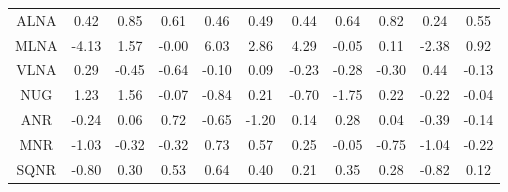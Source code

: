 \begin{longtable}{ | c || c | c | c | c | c | c | c | c | c || c |}
ALNA &  \cellcolor[HTML]{F7F7FF} 0.42 &  \cellcolor[HTML]{E7E7FF} 0.85 &  \cellcolor[HTML]{EFEFFF} 0.61 &  \cellcolor[HTML]{F7F7FF} 0.46 &  \cellcolor[HTML]{EFEFFF} 0.49 &  \cellcolor[HTML]{F7F7FF} 0.44 &  \cellcolor[HTML]{EFEFFF} 0.64 &  \cellcolor[HTML]{E7E7FF} 0.82 &  \cellcolor[HTML]{F7F7FF} 0.24 &  \cellcolor[HTML]{EFEFFF} 0.55 \\
MLNA &  \cellcolor[HTML]{FF9797} -4.13 &  \cellcolor[HTML]{D7D7FF} 1.57 &  \cellcolor[HTML]{FFFFFF} -0.00 &  \cellcolor[HTML]{6868FF} 6.03 &  \cellcolor[HTML]{B7B7FF} 2.86 &  \cellcolor[HTML]{9797FF} 4.29 &  \cellcolor[HTML]{FFFFFF} -0.05 &  \cellcolor[HTML]{FFFFFF} 0.11 &  \cellcolor[HTML]{FFC7C7} -2.38 &  \cellcolor[HTML]{E7E7FF} 0.92 \\
VLNA &  \cellcolor[HTML]{F7F7FF} 0.29 &  \cellcolor[HTML]{FFF7F7} -0.45 &  \cellcolor[HTML]{FFEFEF} -0.64 &  \cellcolor[HTML]{FFFFFF} -0.10 &  \cellcolor[HTML]{FFFFFF} 0.09 &  \cellcolor[HTML]{FFF7F7} -0.23 &  \cellcolor[HTML]{FFF7F7} -0.28 &  \cellcolor[HTML]{FFF7F7} -0.30 &  \cellcolor[HTML]{F7F7FF} 0.44 &  \cellcolor[HTML]{FFFFFF} -0.13 \\
NUG &  \cellcolor[HTML]{DFDFFF} 1.23 &  \cellcolor[HTML]{D7D7FF} 1.56 &  \cellcolor[HTML]{FFFFFF} -0.07 &  \cellcolor[HTML]{FFE7E7} -0.84 &  \cellcolor[HTML]{F7F7FF} 0.21 &  \cellcolor[HTML]{FFEFEF} -0.70 &  \cellcolor[HTML]{FFCFCF} -1.75 &  \cellcolor[HTML]{F7F7FF} 0.22 &  \cellcolor[HTML]{FFF7F7} -0.22 &  \cellcolor[HTML]{FFFFFF} -0.04 \\
ANR &  \cellcolor[HTML]{FFF7F7} -0.24 &  \cellcolor[HTML]{FFFFFF} 0.06 &  \cellcolor[HTML]{EFEFFF} 0.72 &  \cellcolor[HTML]{FFEFEF} -0.65 &  \cellcolor[HTML]{FFDFDF} -1.20 &  \cellcolor[HTML]{FFFFFF} 0.14 &  \cellcolor[HTML]{F7F7FF} 0.28 &  \cellcolor[HTML]{FFFFFF} 0.04 &  \cellcolor[HTML]{FFF7F7} -0.39 &  \cellcolor[HTML]{FFFFFF} -0.14 \\
MNR &  \cellcolor[HTML]{FFE7E7} -1.03 &  \cellcolor[HTML]{FFF7F7} -0.32 &  \cellcolor[HTML]{FFF7F7} -0.32 &  \cellcolor[HTML]{EFEFFF} 0.73 &  \cellcolor[HTML]{EFEFFF} 0.57 &  \cellcolor[HTML]{F7F7FF} 0.25 &  \cellcolor[HTML]{FFFFFF} -0.05 &  \cellcolor[HTML]{FFEFEF} -0.75 &  \cellcolor[HTML]{FFE7E7} -1.04 &  \cellcolor[HTML]{FFF7F7} -0.22 \\
SQNR &  \cellcolor[HTML]{FFE7E7} -0.80 &  \cellcolor[HTML]{F7F7FF} 0.30 &  \cellcolor[HTML]{EFEFFF} 0.53 &  \cellcolor[HTML]{EFEFFF} 0.64 &  \cellcolor[HTML]{F7F7FF} 0.40 &  \cellcolor[HTML]{F7F7FF} 0.21 &  \cellcolor[HTML]{F7F7FF} 0.35 &  \cellcolor[HTML]{F7F7FF} 0.28 &  \cellcolor[HTML]{FFE7E7} -0.82 &  \cellcolor[HTML]{FFFFFF} 0.12 \\

\end{longtable}
